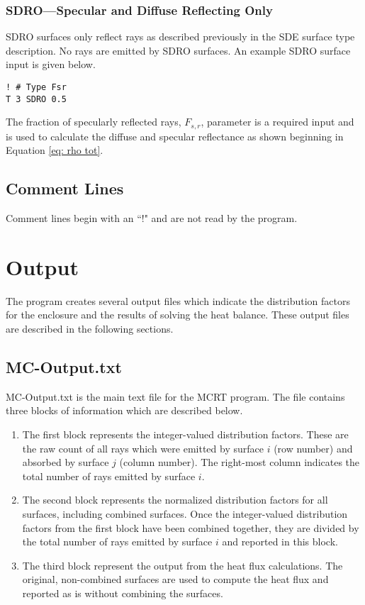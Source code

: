 \documentclass{article}
\begin{document}
\subsubsection{SDRO---Specular and Diffuse Reflecting Only}

SDRO surfaces only reflect rays as described previously in the SDE surface type description. No rays are emitted by SDRO surfaces. An example SDRO surface input is given below.

\begin{lstlisting}
! # Type Fsr
T 3 SDRO 0.5
\end{lstlisting}

The fraction of specularly reflected rays, $F_{s,r}$, parameter is a required input and is used to calculate the diffuse and specular reflectance as shown beginning in Equation \ref{eq: rho tot}. 

\subsection{Comment Lines}
\label{subsec:comments}
Comment lines begin with an ``!" and are not read by the program.

\section{Output}
\label{sec:output}

The program creates several output files which indicate the distribution factors for the enclosure and the results of solving the heat balance. These output files are described in the following sections.

\subsection{MC-Output.txt}

MC-Output.txt is the main text file for the MCRT program. The file contains three blocks of information which are described below.

\begin{enumerate}
    \item The first block represents the integer-valued distribution factors. These are the raw count of all rays which were emitted by surface $i$ (row number) and absorbed by surface $j$ (column number). The right-most column indicates the total number of rays emitted by surface $i$.
    
    \item The second block represents the normalized distribution factors for all surfaces, including combined surfaces. Once the integer-valued distribution factors from the first block have been combined together, they are divided by the total number of rays emitted by surface $i$ and reported in this block.
    
    \item The third block represent the output from the heat flux calculations. The original, non-combined surfaces are used to compute the heat flux and reported as is without combining the surfaces.
\end{enumerate}
\end{document}
